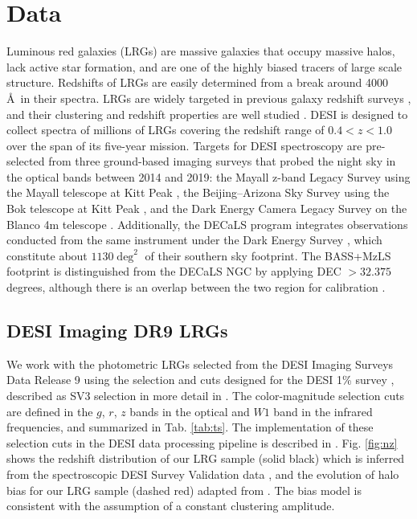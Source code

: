 \section{Data}
\label{sec:data}
Luminous red galaxies (LRGs) are massive galaxies that occupy massive halos, lack active star formation, and are one of the highly biased tracers of large scale structure. Redshifts of LRGs are easily determined from a break around 4000 \AA~in their spectra. LRGs are widely targeted in previous galaxy redshift surveys \citep[see, e.g.,][]{eisenstein2001spectroscopic, prakash2016sdss}, and their clustering and redshift properties are well studied \citep[see, e.g.,][]{alam2021completed}. DESI is designed to collect spectra of millions of LRGs covering the redshift range of $0.4<z<1.0$ over the span of its five-year mission. Targets for DESI spectroscopy are pre-selected from three ground-based imaging surveys that probed the night sky in the optical bands between 2014 and 2019: the Mayall z-band Legacy Survey using the Mayall telescope at Kitt Peak \citep{dey2018overview}, the Beijing–Arizona Sky Survey using the Bok telescope at Kitt Peak \citep{zou2017project}, and the Dark Energy Camera Legacy Survey on the Blanco 4m telescope \citep[DECaLS][]{flaugher2015dark}. Additionally, the DECaLS program integrates observations conducted from the same instrument under the Dark Energy Survey \citep{abbott2016dark}, which constitute about $1130 \deg^{2}$ of their southern sky footprint. The BASS+MzLS footprint is distinguished from the DECaLS NGC by applying DEC $> 32.375$ degrees, although there is an overlap between the two region for calibration \citep{dey2018overview}. 

\subsection{DESI Imaging DR9 LRGs}
We work with the photometric LRGs selected from the DESI Imaging Surveys Data Release 9 \citep[DR9;][]{dey2018overview} using the selection and cuts designed for the DESI 1\% survey , described as SV3 selection in more detail in \cite{zhou2022target}. The color-magnitude selection cuts are defined in the $g$, $r$, $z$ bands in the optical and $W1$ band in the infrared frequencies, and summarized in Tab. \ref{tab:ts}. The implementation of these selection cuts in the DESI data processing pipeline is described in \cite{myers2022}. Fig. \ref{fig:nz} shows the redshift distribution of our LRG sample (solid black) which is inferred from the spectroscopic DESI Survey Validation data , and the evolution of halo bias for our LRG sample (dashed red) adapted from \cite{zhou2021clustering}. The bias model is consistent with the assumption of a constant clustering amplitude. 

